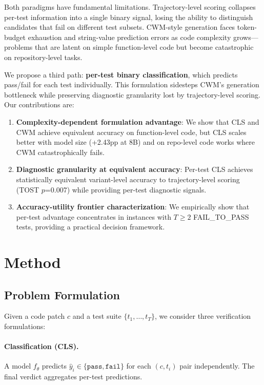 \documentclass[11pt,a4paper]{article}
\begin{document}
Both paradigms have fundamental limitations. Trajectory-level scoring collapses per-test information into a single binary signal, losing the ability to distinguish candidates that fail on different test subsets. CWM-style generation faces token-budget exhaustion and string-value prediction errors as code complexity grows---problems that are latent on simple function-level code but become catastrophic on repository-level tasks.

We propose a third path: \textbf{per-test binary classification}, which predicts pass/fail for each test individually. This formulation sidesteps CWM's generation bottleneck while preserving diagnostic granularity lost by trajectory-level scoring. Our contributions are:

\begin{enumerate}
    \item \textbf{Complexity-dependent formulation advantage}: We show that CLS and CWM achieve equivalent accuracy on function-level code, but CLS scales better with model size (+2.43pp at 8B) and on repo-level code works where CWM catastrophically fails.
    \item \textbf{Diagnostic granularity at equivalent accuracy}: Per-test CLS achieves statistically equivalent variant-level accuracy to trajectory-level scoring (TOST $p$=0.007) while providing per-test diagnostic signals.
    \item \textbf{Accuracy-utility frontier characterization}: We empirically show that per-test advantage concentrates in instances with $T\geq2$ FAIL\_TO\_PASS tests, providing a practical decision framework.
\end{enumerate}

\section{Method}

\subsection{Problem Formulation}

Given a code patch $c$ and a test suite $\{t_1, \ldots, t_T\}$, we consider three verification formulations:

\paragraph{Classification (CLS).} A model $f_\theta$ predicts $\hat{y}_i \in \{\texttt{pass}, \texttt{fail}\}$ for each $(c, t_i)$ pair independently. The final verdict aggregates per-test predictions.
\end{document}

